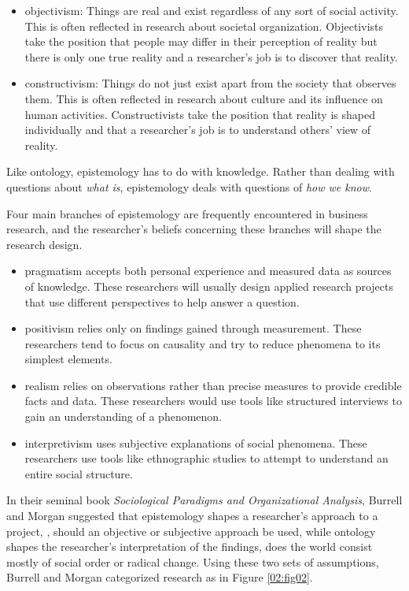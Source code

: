 \begin{itemize}
	\item \Gls{objectivism}: Things are real and exist regardless of any sort of social activity. This is often reflected in research about societal organization. Objectivists take the position that people may differ in their perception of reality but there is only one true reality and a researcher's job is to discover that reality.

	\item \Gls{constructivism}: Things do not just exist apart from the society that observes them. This is often reflected in research about culture and its influence on human activities. Constructivists take the position that reality is shaped individually and that a researcher's job is to understand others' view of reality. 
\end{itemize}

Like ontology, epistemology has to do with knowledge. Rather than dealing with questions about \textit{what is}, epistemology deals with questions of \textit{how we know}. 

Four main branches of epistemology are frequently encountered in business research, and the researcher's beliefs concerning these branches will shape the research design.

\begin{itemize}
	\item \Gls{pragmatism} accepts both personal experience and measured data as sources of knowledge. These researchers will usually design applied research projects that use different perspectives to help answer a question.

	\item \Gls{positivism} relies only on findings gained through measurement. These researchers tend to focus on causality and try to reduce phenomena to its simplest elements.

	\item \Gls{realism} relies on observations rather than precise measures to provide credible facts and data. These researchers would use tools like structured interviews to gain an understanding of a phenomenon.

	\item \Gls{interpretivism} uses subjective explanations of social phenomena. These researchers use tools like ethnographic studies to attempt to understand an entire social structure.
\end{itemize}

In their seminal book \textit{Sociological Paradigms and Organizational Analysis}\cite{burrell2017sociological}, Burrell and Morgan suggested that epistemology shapes a researcher's approach to a project, \eg, should an objective or subjective approach be used, while ontology shapes the researcher's interpretation of the findings, \eg does the world consist mostly of social order or radical change. Using these two sets of assumptions, Burrell and Morgan categorized research as in Figure \ref{02:fig02}.

